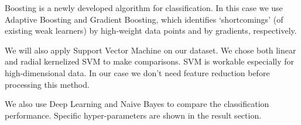 \documentclass[11pt]{article}
\begin{document}
Boosting is a newly developed algorithm for classification. In this case we use Adaptive Boosting and Gradient Boosting, which identifies ‘shortcomings’ (of existing weak learners) by high-weight data points and by gradients, respectively.

We will also apply Support Vector Machine on our dataset. We chose both linear and radial kernelized SVM to make comparisons. SVM is workable especially for high-dimensional data. In our case we don't need feature reduction before processing this method.

We also use Deep Learning and Naive Bayes to compare the classification performance. Specific hyper-parameters are shown in the result section.





\end{document}
